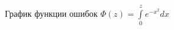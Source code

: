 \documentclass{article}
\begin{document}
\fboxsep=0mm%
\fboxrule=2pt%
\begin{figure}[H]
\centering
\begin{minipage}[t]{.4\textwidth}
\begin{figure}[H]
  \centering
  \caption{График функции ошибок $\Phi(z) = \int\limits_0^{z} e^{-x^2}dx$}
  \label{fig:err_int}
  \end{figure}%
\end{minipage}\hspace{10pt}%
\begin{minipage}[t]{.4\textwidth}%
\begin{figure}[H]
  \centering

\end{figure}
\end{minipage}
\end{figure}
\end{document}

